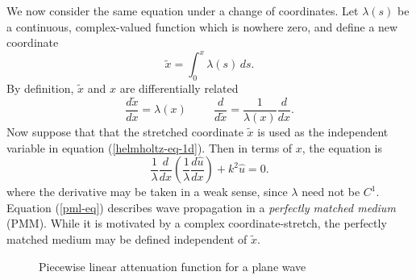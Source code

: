 \documentclass{article}
\begin{document}
We now consider the same equation under a change of coordinates.  Let
$\lambda(s)$ be a continuous, complex-valued function which is nowhere
zero, and define a new coordinate
\begin{equation}
  \tilde{x} = \int_0^x \lambda(s) \, ds.
\end{equation}
By definition, $\tilde{x}$ and $x$ are differentially related
\begin{equation}
  \frac{d \tilde{x}}{dx} = \lambda(x) 
  \hspace{1cm}
  \frac{d}{d \tilde{x}} = \frac{1}{\lambda(x)} \frac{d}{dx}.
\end{equation}
Now suppose that that the stretched coordinate $\tilde{x}$ is used
as the independent variable in equation (\ref{helmholtz-eq-1d}).
Then in terms of $x$, the equation is
\begin{equation}
  \label{pml-eq}
  \frac{1}{\lambda} \frac{d}{dx} 
    \left( \frac{1}{\lambda} \frac{d\hat{u}}{dx} \right) +
  k^2 \hat{u} = 0.
\end{equation}
where the derivative may be taken in a weak sense, since $\lambda$
need not be $C^1$.
Equation (\ref{pml-eq}) describes wave propagation in a
\emph{perfectly matched medium} (PMM).  While it is motivated by a complex
coordinate-stretch, the perfectly matched medium may be defined
independent of $\tilde{x}$.

\begin{figure}
  \begin{center} \scalebox{0.7}{  } \end{center}
  \vspace{-3mm}
  \caption{Piecewise linear attenuation function for a plane wave}
  \label{sigma-schematic}
\end{figure}
\end{document}
